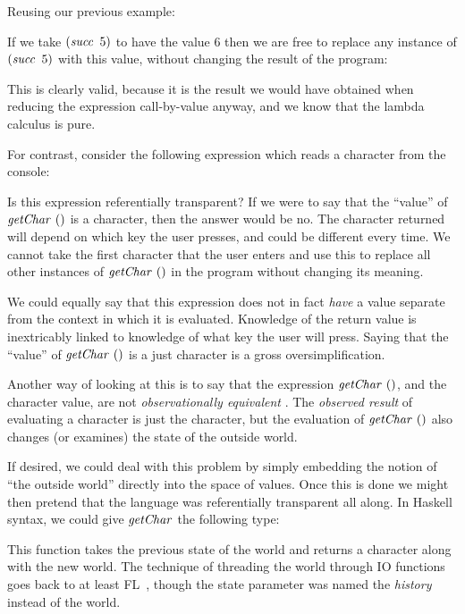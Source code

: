 \clearpage{}
Reusing our previous example:


If we take $(\operatorname{\mathit{succ}} \ 5)$ to have the value $6$ then we are free to replace any instance of $(\operatorname{\mathit{succ}} \ 5)$ with this value, without changing the result of the program:


This is clearly valid, because it is the result we would have obtained when reducing the expression call-by-value anyway, and we know that the lambda calculus is pure.

For contrast, consider the following expression which reads a character from the console:

\code{
	$\igetChar \ ()$
}

Is this expression referentially transparent? If we were to say that the ``value'' of $\igetChar \ ()$ is a character, then the answer would be no. The character returned will depend on which key the user presses, and could be different every time. We cannot take the first character that the user enters and use this to replace all other instances of $\igetChar \ ()$ in the program without changing its meaning.

We could equally say that this expression does not in fact \emph{have} a value separate from the context in which it is evaluated. Knowledge of the return value is inextricably linked to knowledge of what key the user will press. Saying that the ``value'' of $\igetChar \ ()$ is a just character is a gross oversimplification. 

Another way of looking at this is to say that the expression $\igetChar \ ()$, and the character value, are not \emph{observationally equivalent} \cite{gunter:semantics}. The \emph{observed result} of evaluating a character is just the character, but the evaluation of $\igetChar \ ()$ also changes (or examines) the state of the outside world.

If desired, we could deal with this problem by simply embedding the notion of ``the outside world'' directly into the space of values. Once this is done we might then pretend that the language was referentially transparent all along. In Haskell syntax, we could give $\operatorname{\mathit{getChar}}$ the following type:

\code{
	$\igetChar :: \iWorld \to (\iChar, \iWorld)$
}

This function takes the previous state of the world and returns a character along with the new world. The technique of threading the world through IO functions goes back to at least FL~\cite{aiken:fl-project}, though the state parameter was named the \emph{history} instead of the world.

